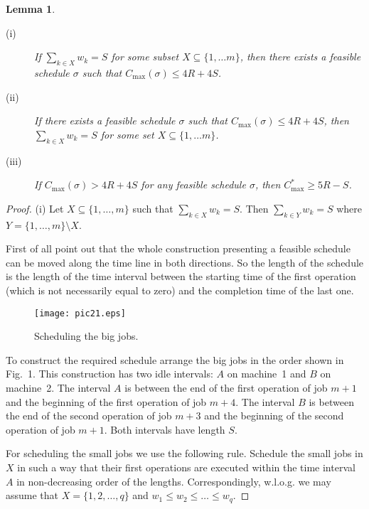 \documentclass[12pt,a4paper]{article}
\newtheorem{lemma}{Lemma}
\begin{document}
\begin{lemma}\ \label{l1}
\begin{description}
  \item[(i)] If $\sum_{k\in X}w_k =S$ for some subset $X\subseteq \{1,\ldots
m\}$, then there exists a feasible schedule $\sigma$ such that
$C_{\max}(\sigma)\leq 4R+4S$.
  \item[(ii)] If there exists a feasible schedule $\sigma$ such that
$C_{\max}(\sigma) \leq 4R+4S$, then $\sum_{k\in X}w_k =S$ for some
set $X\subseteq \{1,\ldots m\}$.
  \item[(iii)] If
$C_{\max}(\sigma) > 4R+4S$ for any feasible schedule $\sigma$, then
$C_{\max}^*\geq 5R-S$.
\end{description}
\end{lemma}
\begin{proof}

(i) Let $X\subseteq \{1,\ldots, m\}$ such that $ \sum_{k\in
X}w_k=S$. Then $ \sum_{k\in Y}w_k=S$ where $Y=\{1,\ldots,
m\}\setminus X$.

First of all point out that the whole construction presenting a
feasible schedule can be moved along the time line in both
directions. So the length of the schedule is the length of the time
interval between the starting time  of the first operation (which is
not necessarily equal to zero) and the completion time of the last
one.
\begin{figure}[h] \label{ex5}
\vspace{1mm}
\begin{center}
\texttt{[image: pic21.eps]}
  \caption{Scheduling the big jobs.}
\end{center}
\end{figure}
To construct the required schedule arrange the big jobs in the order
shown in Fig.~1. This construction has two idle intervals: $A$ on
machine~1 and $B$ on machine~2. The interval $A$ is between the end
of the first operation of job $m+1$ and the beginning of the first
operation of job $m+4$. The interval $B$ is between the end of the
second operation of job $m+3$ and the beginning of the second
operation of job $m+1$. Both intervals have length $S$.

For scheduling the small jobs we use the following rule. Schedule
the small jobs in $X$ in such a way that their first operations are
executed within the time interval $A$ in non-decreasing order of the
lengths. Correspondingly, w.l.o.g. we may assume that
$X=\{1,2,\ldots ,q\}$ and $w_1\leq w_2\leq \ldots \leq w_q$.


\end{proof}
\end{document}
